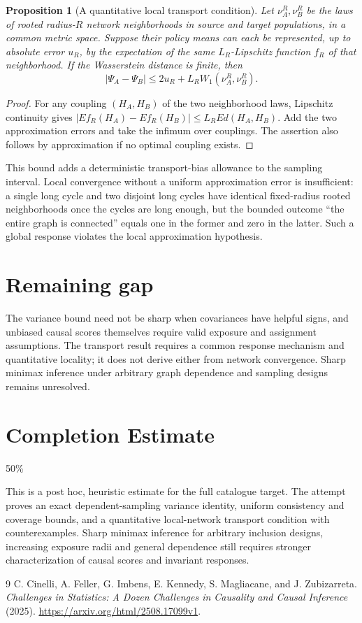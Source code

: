 \documentclass[11pt]{article}
\newtheorem{proposition}[theorem]{Proposition}
\theoremstyle{remark}
\begin{document}
\begin{proposition}[A quantitative local transport condition]
Let $\nu_A^R,\nu_B^R$ be the laws of rooted radius-$R$ network neighborhoods in source and target populations, in a common metric space. Suppose their policy means can each be represented, up to absolute error $u_R$, by the expectation of the same $L_R$-Lipschitz function $f_R$ of that neighborhood. If the Wasserstein distance is finite, then
\[
 |\Psi_A-\Psi_B|\le2u_R+L_R W_1(\nu_A^R,\nu_B^R).
\]
\end{proposition}
\begin{proof}
For any coupling $(H_A,H_B)$ of the two neighborhood laws, Lipschitz continuity gives
$|Ef_R(H_A)-Ef_R(H_B)|\le L_REd(H_A,H_B)$. Add the two approximation errors and take the infimum over couplings. The assertion also follows by approximation if no optimal coupling exists.
\end{proof}
This bound adds a deterministic transport-bias allowance to the sampling interval. Local convergence without a uniform approximation error is insufficient: a single long cycle and two disjoint long cycles have identical fixed-radius rooted neighborhoods once the cycles are long enough, but the bounded outcome ``the entire graph is connected'' equals one in the former and zero in the latter. Such a global response violates the local approximation hypothesis.

\section*{Remaining gap}
The variance bound need not be sharp when covariances have helpful signs, and unbiased causal scores themselves require valid exposure and assignment assumptions. The transport result requires a common response mechanism and quantitative locality; it does not derive either from network convergence. Sharp minimax inference under arbitrary graph dependence and sampling designs remains unresolved.

\section{Completion Estimate}
50\%

This is a post hoc, heuristic estimate for the full catalogue target.
The attempt proves an exact dependent-sampling variance identity, uniform consistency and coverage bounds, and a quantitative local-network transport condition with counterexamples. Sharp minimax inference for arbitrary inclusion designs, increasing exposure radii and general dependence still requires stronger characterization of causal scores and invariant responses.

\begin{thebibliography}{9}
 C. Cinelli, A. Feller, G. Imbens, E. Kennedy, S. Magliacane, and J. Zubizarreta. \emph{Challenges in Statistics: A Dozen Challenges in Causality and Causal Inference} (2025). \url{https://arxiv.org/html/2508.17099v1}.
\end{thebibliography}
\end{document}
